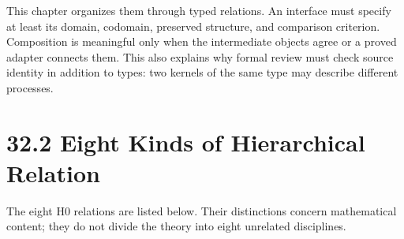 \documentclass[
  english,
  11pt,
  oneside]{book}
\begin{document}
This chapter organizes them through typed relations. An interface must specify at least its domain, codomain, preserved structure, and comparison criterion. Composition is meaningful only when the intermediate objects agree or a proved adapter connects them. This also explains why formal review must check source identity in addition to types: two kernels of the same type may describe different processes.

\section{32.2 Eight Kinds of Hierarchical Relation}\label{eight-kinds-of-hierarchical-relation}

The eight H0 relations are listed below. Their distinctions concern mathematical content; they do not divide the theory into eight unrelated disciplines.
\end{document}
